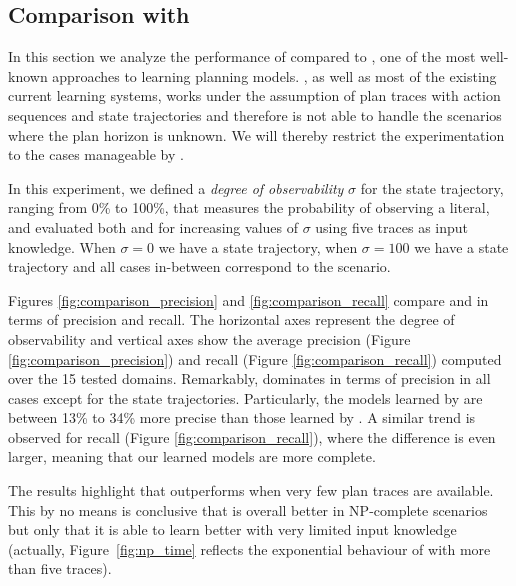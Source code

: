 \subsection{Comparison with \ARMS}
\label{compare_ARMS}

In this section we analyze the performance of \FAMA compared to \ARMS, one of the most well-known approaches to learning planning models. \ARMS, as well as most of the existing current learning systems, works under the assumption of plan traces with \FO action sequences and \NO state trajectories and therefore is not able to handle the scenarios where the plan horizon is unknown. We will thereby restrict the experimentation to the cases manageable by \ARMS.

In this experiment, we defined a \emph{degree of observability} $\sigma$ for the state trajectory, ranging from 0\% to 100\%, that measures the probability of observing a literal, and evaluated both \FAMA and \ARMS for increasing values of $\sigma$ using five traces as input knowledge. When $\sigma = 0$ we have a \NO state trajectory, when $\sigma=100$ we have a \FO state trajectory and all cases in-between correspond to the \PO scenario.

Figures \ref{fig:comparison_precision} and \ref{fig:comparison_recall} compare \FAMA and \ARMS in terms of precision and recall. The horizontal axes represent the degree of observability and vertical axes show the average precision (Figure \ref{fig:comparison_precision}) and recall (Figure \ref{fig:comparison_recall}) computed over the 15 tested domains. Remarkably, \FAMA dominates in terms of precision in all cases except for the \FO state trajectories. Particularly, the models learned by \FAMA are between 13\% to 34\% more precise than those learned by \ARMS. A similar trend is observed for recall (Figure \ref{fig:comparison_recall}), where the difference is even larger, meaning that our learned models are more complete.

The results highlight that \FAMA outperforms \ARMS when very few plan traces are available. This by no means is conclusive that \FAMA is overall better in NP-complete scenarios but only that it is able to learn better with very limited input knowledge (actually, Figure~\ref{fig:np_time} reflects the exponential behaviour of \FAMA with more than five traces).



